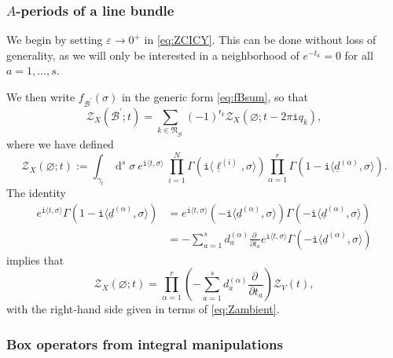 \documentclass[12pt,a4paper,oneside]{amsart}
\numberwithin{equation}{section}
\theoremstyle{definition}
\theoremstyle{remark}
\DeclareMathOperator{\dd}{d}
\newcommand{\mz}{\mathcal{Z}}
\newcommand{\Br}{\mathcal{B}}
\newcommand{\ii}{\mathtt{i}}
\begin{document}
\begin{appendix}
\subsubsection{\texorpdfstring{$A$}{A}-periods of a line bundle}
\label{app:sec:mzV}
We begin by setting $\varepsilon \to 0^{+}$ in \eqref{eq:ZCICY}. This can be done without loss of generality, as we will only be interested in a neighborhood of $e^{-t_a}=0$ for all $a=1, \dots, s$.\par
We then write $f_{\Br^{\prime}} (\sigma)$ in the generic form \eqref{eq:fBsum}, so that 
\begin{equation*}
	\mz_{X} \left( \Br^{\prime} ; t \right) =  \sum_{k \in \mathfrak{N}_{\Br^{\prime}}} (-1)^{\mathsf{r}_{k}} \mz_{X} (\varnothing ; t-2 \pi \ii q_k) ,
\end{equation*}
where we have defined
\begin{equation*}
	 \mz_{X} (\varnothing ;t) := \int_{\gamma_t} \dd^s \sigma~e^{\ii \langle t, \sigma\rangle} ~\prod_{i=1}^{N} \Gamma \left(  \ii \langle \underline{\ell}^{(i)}, \sigma \rangle \right) \prod_{\alpha=1}^{r} \Gamma \left( 1 - \ii \langle\underline{d}^{(\alpha)}, \sigma \rangle \right) .
\end{equation*}
The identity 
\begin{align*}
	e^{\ii \langle t, \sigma\rangle} \Gamma \left( 1- \ii \langle\underline{d}^{(\alpha)}, \sigma \rangle \right) & = e^{\ii \langle t, \sigma\rangle}  \left(- \ii \langle\underline{d}^{(\alpha)}, \sigma \rangle \right) \Gamma \left(- \ii\langle\underline{d}^{(\alpha)}, \sigma \rangle \right) \\
	&= - \sum_{a=1}^{s} d_{a}^{(\alpha)} \frac{ \partial \ }{\partial t_a } e^{\ii \langle t, \sigma\rangle} \Gamma \left(- \ii\langle\underline{d}^{(\alpha)}, \sigma \rangle \right) 
\end{align*}
implies that 
\begin{equation}
\label{eq:ZXtoZVrel}
	\mz_{X} (\varnothing ;t) = \prod_{\alpha=1}^{r} \left( - \sum_{a=1}^{s} d_{a}^{(\alpha)} \frac{ \partial \ }{\partial t_a } \right) \mz_{V} \left( t \right) ,
\end{equation}
with the right-hand side given in terms of \eqref{eq:Zambient}. 




\subsubsection{Box operators from integral manipulations}
\label{app:sec:BoxOp}


\end{appendix}
\end{document}
